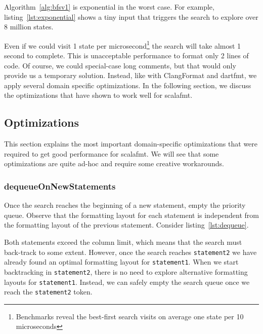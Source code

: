 Algorithm~\ref{alg:bfsv1} is exponential in the worst case.
For example, listing~\ref{lst:exponential} shows a tiny input that triggers the search to explore over 8 million states.

Even if we could visit 1 state per microsecond\footnote{
  Benchmarks reveal the best-first search visits on average one state per 10 microseconds
} the search will take almost 1 second to complete.
This is unacceptable performance to format only 2 lines of code.
Of course, we could special-case long comments, but that would only provide us a temporary solution.
Instead, like with ClangFormat and dartfmt, we apply several domain specific optimizations.
In the following section, we discuss the optimizations that have shown to work well for scalafmt.

\subsection{Optimizations}\label{sec:optimizations}
This section explains the most important domain-specific optimizations that were required to get good performance for scalafmt.
We will see that some optimizations are quite ad-hoc and require some creative workarounds.

\subsubsection{dequeueOnNewStatements}\label{sec:dequeue}
Once the search reaches the beginning of a new statement, empty the priority queue.
Observe that the formatting layout for each statement is independent from the formatting layout of the previous statement.
Consider listing~\ref{lst:dequeue}.

Both statements exceed the column limit, which means that the search must back-track to some extent.
However, once the search reaches \texttt{statement2} we have already found an optimal formatting layout for \texttt{statement1}.
When we start backtracking in \texttt{statement2}, there is no need to explore alternative formatting layouts for \texttt{statement1}.
Instead, we can safely empty the search queue once we reach the \texttt{statement2} token.

